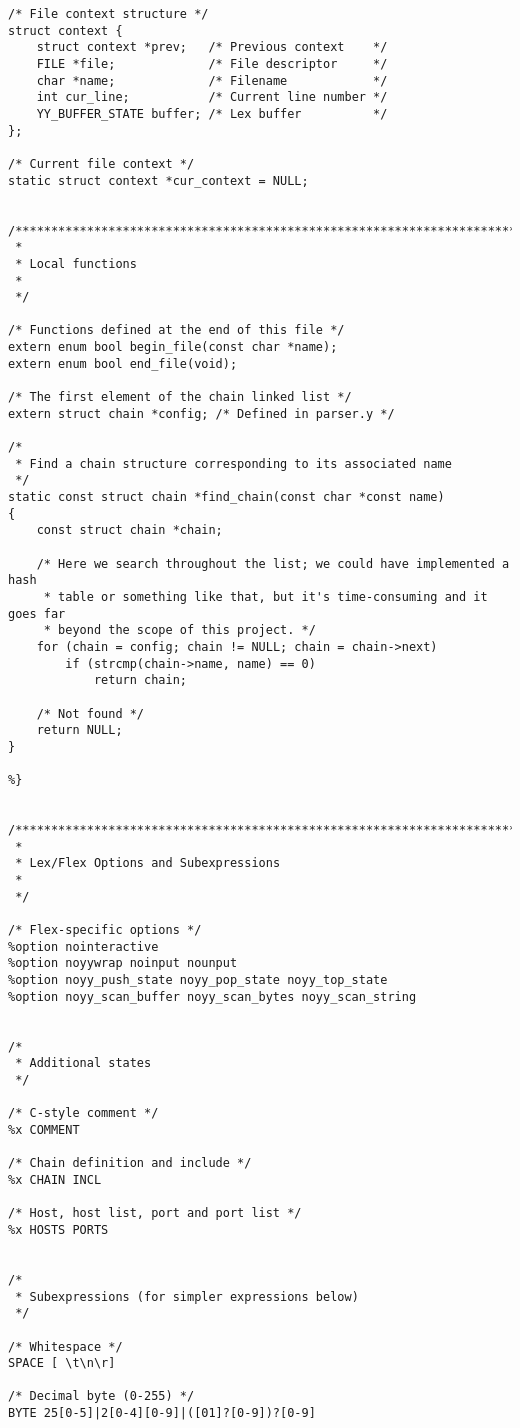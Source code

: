 \documentclass[a4paper,landscape,twocolumn,11pt]{article}
\begin{document}
{\begin{verbatim}
/* File context structure */
struct context {
    struct context *prev;   /* Previous context    */
    FILE *file;             /* File descriptor     */
    char *name;             /* Filename            */
    int cur_line;           /* Current line number */
    YY_BUFFER_STATE buffer; /* Lex buffer          */
};

/* Current file context */
static struct context *cur_context = NULL;


/*****************************************************************************
 *
 * Local functions
 *
 */

/* Functions defined at the end of this file */
extern enum bool begin_file(const char *name);
extern enum bool end_file(void);

/* The first element of the chain linked list */
extern struct chain *config; /* Defined in parser.y */

/*
 * Find a chain structure corresponding to its associated name
 */
static const struct chain *find_chain(const char *const name)
{
    const struct chain *chain;

    /* Here we search throughout the list; we could have implemented a hash
     * table or something like that, but it's time-consuming and it goes far
     * beyond the scope of this project. */
    for (chain = config; chain != NULL; chain = chain->next)
        if (strcmp(chain->name, name) == 0)
            return chain;

    /* Not found */
    return NULL;
}

%}


/*****************************************************************************
 *
 * Lex/Flex Options and Subexpressions
 *
 */

/* Flex-specific options */
%option nointeractive
%option noyywrap noinput nounput
%option noyy_push_state noyy_pop_state noyy_top_state
%option noyy_scan_buffer noyy_scan_bytes noyy_scan_string


/*
 * Additional states
 */

/* C-style comment */
%x COMMENT

/* Chain definition and include */
%x CHAIN INCL

/* Host, host list, port and port list */
%x HOSTS PORTS


/*
 * Subexpressions (for simpler expressions below)
 */

/* Whitespace */
SPACE [ \t\n\r]

/* Decimal byte (0-255) */
BYTE 25[0-5]|2[0-4][0-9]|([01]?[0-9])?[0-9]


\end{verbatim}}
\end{document}
